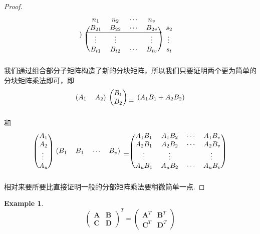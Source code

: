 \documentclass{article}
\newtheorem{example}[theorem]{Example}
\newcommand{\mbf}[1]{\bm{#1}}
\begin{document}
\begin{proof}
$$\begin{array}{ll}
\begin{blockarray}{cccc}
\begin{block}{c(c|cc)}
\end{block} 
\end{blockarray}~
\begin{blockarray}{ccccc}
n_1    & n_2    & \cdots & n_v  &\\
\begin{block}{(cccc)c}
B_{21} & B_{22} & \cdots & B_{2v} & s_2 \\
\BAhhline{----}
\vdots & \vdots & 		 & \vdots & \vdots \\
B_{t1} & B_{t2} & \cdots & B_{tv} & s_t \\
\end{block}
\end{blockarray}
\end{array}
$$
我们通过组合部分子矩阵构造了新的分块矩阵，所以我们只要证明两个更为简单的分块矩阵乘法即可，即
$$
\begin{blockarray}{(cc)}
A_1 & A_2
\end{blockarray} ~
\begin{blockarray}{(c)}
B_1 \\
B_2 \\
\end{blockarray}
= \begin{blockarray}{(c)}
A_1B_1 + A_2B_2
\end{blockarray}
$$
和
$$
\begin{blockarray}{(c)}
A_{1} \\
A_{2} \\
\vdots \\
A_{u} \\
\end{blockarray} ~
\begin{blockarray}{(cccc)}
B_{1} & B_{1} & \cdots & B_{v} 
\end{blockarray} = 
\begin{blockarray}{(cccc)}
A_{1}B_1 & A_{1}B_{2} & \cdots & A_{1}B_{v} \\
A_{2}B_1 & A_{2}B_{2} & \cdots & A_{2}B_{v} \\
\vdots & \vdots &  & \vdots \\
A_{u}B_1 & A_{u}B_{2} & \cdots & A_{u}B_{v} \\
\end{blockarray}
$$
相对来要所要比直接证明一般的分部矩阵乘法要稍微简单一点. 
\end{proof}

\begin{example}
\rm 
$$
\begin{pmatrix}
\mbf{A} & \mbf{B} \\
\mbf{C} & \mbf{D} 
\end{pmatrix}^T =
\begin{pmatrix}
\mbf{A}^T & \mbf{B}^T \\
\mbf{C}^T & \mbf{D}^T
\end{pmatrix}
$$
\end{example}
\end{document}
